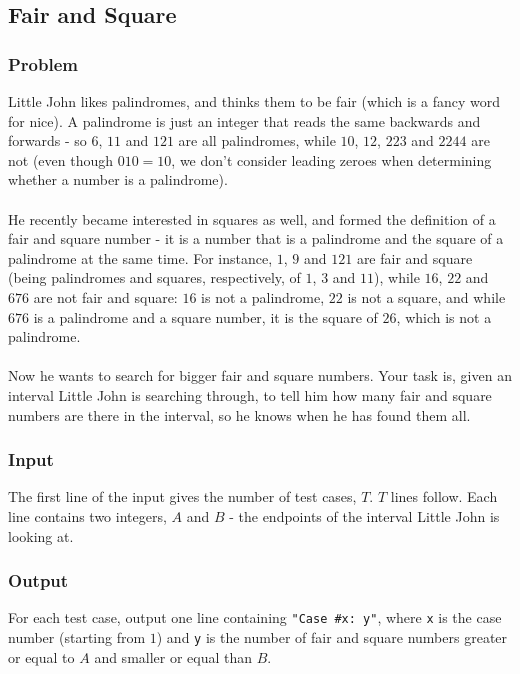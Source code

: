 \documentclass[titlepage]{article}
\begin{document}
\subsection{Fair and Square}

\subsubsection{Problem}
Little John likes palindromes, and thinks them to be fair (which is a fancy word for nice). A palindrome is just an integer that reads the same backwards and forwards - so $6$, $11$ and $121$ are all palindromes, while $10$, $12$, $223$ and $2244$ are not (even though $010=10$, we don't consider leading zeroes when determining whether a number is a palindrome).
\paragraph{}
He recently became interested in squares as well, and formed the definition of a fair and square number - it is a number that is a palindrome and the square of a palindrome at the same time. For instance, $1$, $9$ and $121$ are fair and square (being palindromes and squares, respectively, of $1$, $3$ and $11$), while $16$, $22$ and $676$ are not fair and square: $16$ is not a palindrome, $22$ is not a square, and while $676$ is a palindrome and a square number, it is the square of $26$, which is not a palindrome.
\paragraph{}
Now he wants to search for bigger fair and square numbers. Your task is, given an interval Little John is searching through, to tell him how many fair and square numbers are there in the interval, so he knows when he has found them all.

\subsubsection{Input}
The first line of the input gives the number of test cases, $T$. $T$ lines follow. Each line contains two integers, $A$ and $B$ - the endpoints of the interval Little John is looking at.

\subsubsection{Output}
For each test case, output one line containing \verb+"Case #x: y"+, where \verb+x+ is the case number (starting from $1$) and \verb+y+ is the number of fair and square numbers greater or equal to $A$ and smaller or equal than $B$.
\end{document}
